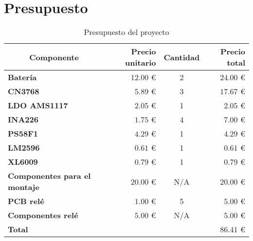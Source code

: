 \section{Presupuesto}

\begin{table}[H]
    \centering
    \begin{tabular}{lrcr}
    \toprule
    \multicolumn{1}{c}{\textbf{Componente}}  & {\textbf{Precio unitario}}   & {\textbf{Cantidad}} & {\textbf{Precio total}}   \\ \midrule
    \textbf{Batería}                         & {$12.00$ \euro}              & {2}                 & {$24.00$ \euro}           \\ 
    \textbf{CN3768}                          & {$5.89$ \euro}               & {3}                 & {$17.67$ \euro}           \\ 
    \textbf{LDO AMS1117}                     & {$2.05$ \euro}               & {1}                 & {$2.05$ \euro}            \\ 
    \textbf{INA226}                          & {$1.75$ \euro}               & {4}                 & {$7.00$ \euro}            \\ 
    \textbf{PS58F1}                          & {$4.29$ \euro}               & {1}                 & {$4.29$ \euro}            \\ 
    \textbf{LM2596}                          & {$0.61$ \euro}               & {1}                 & {$0.61$ \euro}            \\ 
    \textbf{XL6009}                          & {$0.79$ \euro}               & {1}                 & {$0.79$ \euro}            \\ 
    \textbf{Componentes para el montaje}     & {$20.00$ \euro}              & {N/A}               & {$20.00$ \euro}           \\ 
    \textbf{PCB relé}                        & {$1.00$ \euro}               & {5}                 & {$5.00$ \euro}            \\ 
    \textbf{Componentes relé}                & {$5.00$ \euro}               & {N/A}               & {$5.00$ \euro}            \\ \midrule
    \textbf{Total}                           & { }                          & { }                 & {$86.41$ \euro}           \\ \bottomrule
    \end{tabular}
    \caption{Presupuesto del proyecto}
    \label{tab:presupuesto}
\end{table}